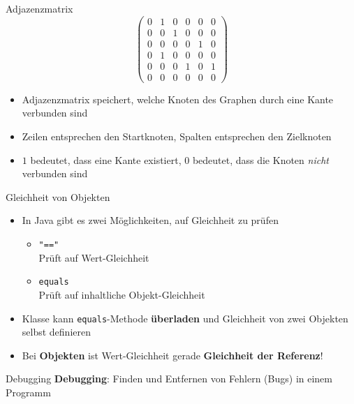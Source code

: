 \documentclass[18pt]{beamer}
\begin{document}
\begin{frame}{Adjazenzmatrix}
    \[
    \left(
    \begin{array}{cccccc}
        0 & 1 & 0 & 0 & 0 & 0 \\
        0 & 0 & 1 & 0 & 0 & 0 \\
        0 & 0 & 0 & 0 & 1 & 0 \\
        0 & 1 & 0 & 0 & 0 & 0 \\
        0 & 0 & 0 & 1 & 0 & 1 \\
        0 & 0 & 0 & 0 & 0 & 0
    \end{array}
    \right)
    \]

    \begin{itemize}
        \item Adjazenzmatrix speichert, welche Knoten des Graphen durch eine Kante verbunden sind
        \item Zeilen entsprechen den Startknoten, Spalten entsprechen den Zielknoten
        \item $1$ bedeutet, dass eine Kante existiert, $0$ bedeutet, dass die Knoten \textit{nicht} verbunden sind
    \end{itemize}

\end{frame}

\begin{frame}{Gleichheit von Objekten}
    \begin{itemize}
        \item In Java gibt es zwei Möglichkeiten, auf Gleichheit zu prüfen
        \begin{itemize}
            \item \texttt{"=="}\\
            Prüft auf Wert-Gleichheit

            \item \texttt{equals}\\
            Prüft auf inhaltliche Objekt-Gleichheit
        \end{itemize}
        \item Klasse kann \texttt{equals}-Methode \textbf{überladen} und Gleichheit von zwei Objekten selbst definieren
        \item \alert{Bei \textbf{Objekten} ist Wert-Gleichheit gerade \textbf{Gleichheit der Referenz}!}
    \end{itemize}
\end{frame}

\begin{frame}{Debugging}
    \textbf{Debugging}: Finden und Entfernen von Fehlern (Bugs) in einem Programm
\end{frame}
\end{document}

